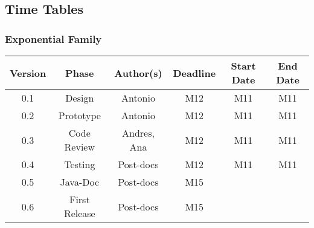 \newpage
\subsection{Time Tables}

\subsubsection*{Exponential Family}

\begin{table}[H]
\begin{tabular}{cccccc}
\hline
\textbf{Version} & \textbf{Phase} & \textbf{Author(s)} & \textbf{Deadline} & \textbf{Start Date} & \textbf{End Date}\\
\hline
0.1 & Design & Antonio & M12 & M11 & M11\\
\hline 
0.2 & Prototype & Antonio & M12 & M11 & M11 \\
\hline 
0.3 & Code Review & Andres, Ana &  M12 &  M11 & M11\\
\hline 
0.4 & Testing & Post-docs &  M12 &  M11 & M11\\
\hline 
0.5 & Java-Doc  & Post-docs &  M15 & & \\
\hline 
0.6 & First Release & Post-docs &  M15 & & \\
\hline
\end{tabular}
\end{table}


